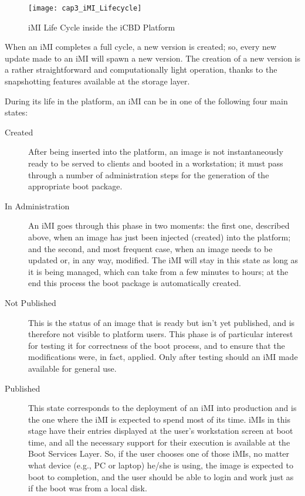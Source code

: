 \begin{figure}[htbp]
	\centering
	\texttt{[image: cap3\_iMI\_Lifecycle]}
	\caption{iMI Life Cycle inside the iCBD Platform}
	\label{fig:icbd_iMI_lifecycle}
\end{figure}

When an iMI completes a full cycle, a new version is created; so, every new update made to an iMI will spawn a new version. The creation of a new version is a rather straightforward and computationally light operation, thanks to the snapshotting features available at the storage layer.

During its life in the platform, an iMI can be in one of the following four main states:

\begin{description}
	\item [Created] After being inserted into the platform, an image is not instantaneously ready to be served to clients and booted in a workstation; it must pass through a number of administration steps for the generation of the appropriate boot package.
	\item [In Administration] An iMI goes through this phase in two moments: the first one, described above, when an image has just been injected (created) into the platform; and the second, and most frequent case, when an image needs to be updated or, in any way, modified. The iMI will stay in this state as long as it is being managed, which can take from a few minutes to hours; at the end this process the boot package is automatically created.
	\item [Not Published] This is the status of an image that is ready but isn’t yet published, and is therefore not visible to platform users. This phase is of particular interest for testing it for correctness of the boot process, and to ensure that the modifications were, in fact, applied. Only after testing should an iMI made available for general use.
	\item [Published] This state corresponds to the deployment of an iMI into production and is the one where the iMI is expected to spend most of its time. iMIs in this stage have their entries displayed at the user’s workstation screen at boot time, and all the necessary support for their execution is available at the Boot Services Layer. So, if the user chooses one of those iMIs, no matter what device (e.g., PC or laptop) he/she is using, the image is expected to boot to completion, and the user should be able to login and work just as if the boot was from a local disk.
\end{description}

